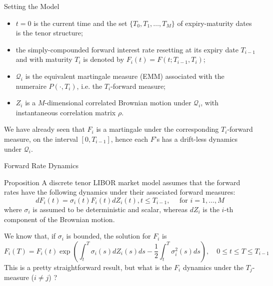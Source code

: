 \documentclass{beamer}
\begin{document}
\begin{frame}{Setting the Model}
	\begin{itemize}
		\item $t = 0$ is the current time and the set $\{T_0, T_1, \dots, T_M\}$ of expiry-maturity dates is the tenor structure; %
		\item the simply-compounded forward interest rate resetting at its expiry date $T_{i-1}$ and with maturity $T_i$ is denoted by $F_i(t) = F(t; T_{i-1}, T_i)$; %
		\item $\mathcal{Q}_i$ is the equivalent martingale measure (EMM) associated with the numeraire $P(\cdot, T_i)$, i.e. the $T_i$-forward measure;
		\item $Z_i$ is a $M$-dimensional correlated Brownian motion under $\mathcal{Q}_i$, with instantaneous correlation matrix $\rho$.
	\end{itemize}
	We have already seen that $F_i$ is a martingale under the corresponding $T_i$-forward measure, on the interval $[0, T_{i-1}]$, hence each $F$’s has a drift-less dynamics under $\mathcal{Q}_i$.
\end{frame}

\begin{frame}{Forward Rate Dynamics}
	\begin{block}{Proposition}
		A discrete tenor LIBOR market model assumes that the forward rates have the following dynamics under their associated forward measures:
		\begin{equation}
			dF_i(t) = \sigma_i(t)F_i(t)dZ_i(t), t \le T_{i-1},\quad\text{ for } i = 1,\ldots, M
			\label{eq:forward_process_lmm}
		\end{equation}
		where $\sigma_i$ is assumed to be deterministic and scalar, whereas $dZ_i$ is the $i$-th component of the Brownian motion.
	\end{block}
	We know that, if $\sigma_i$ is bounded, the solution for $F_i$ is 
	\begin{equation*}
		F_i(T) = F_i(t) \exp\left(\int_t^T\sigma_i(s)dZ_i(s)ds - \frac{1}{2}\int_t^T 
		\sigma_i^2(s)ds\right),\quad 0\le t \le T \le T_{i-1} 
	\end{equation*}
	This is a pretty straightforward result, but what is the $F_i$ dynamics under the $T_j$-measure ($i\neq j$) ?
\end{frame}
\end{document}
